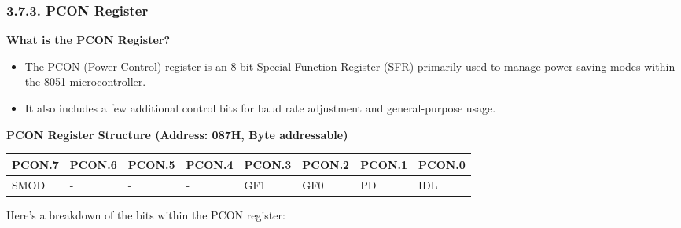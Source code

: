 \documentclass[
]{article}
\begin{document}
\hypertarget{373-pcon-register}{%
\subsubsection{3.7.3. PCON Register}\label{373-pcon-register}}

\textbf{What is the PCON Register?}

\begin{itemize}
\item
  The PCON (Power Control) register is an 8-bit Special Function
  Register (SFR) primarily used to manage power-saving modes within the
  8051 microcontroller.
\item
  It also includes a few additional control bits for baud rate
  adjustment and general-purpose usage.
\end{itemize}

\textbf{PCON Register Structure (Address: 087H, Byte addressable)}

\begin{longtable}[]{@{}llllllll@{}}
\toprule
PCON.7 & PCON.6 & PCON.5 & PCON.4 & PCON.3 & PCON.2 & PCON.1 & PCON.0 \\
\midrule
\endhead
SMOD & - & - & - & GF1 & GF0 & PD & IDL \\
\bottomrule
\end{longtable}

Here's a breakdown of the bits within the PCON register:
\end{document}

